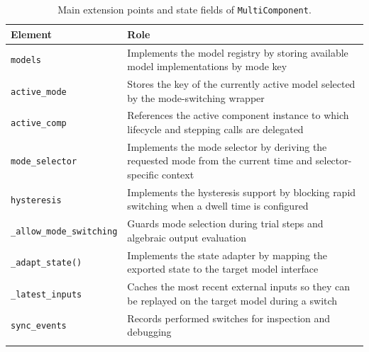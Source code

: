 \begin{table}[t]
  \centering
  \caption[Multi-component extension points.]{Main extension points and state fields of \texttt{MultiComponent}.}
  \label{tab:multi_component_contract}
  \begin{tabular}{lp{9.5cm}}
    \toprule
    \textbf{Element}                  & \textbf{Role}                                                                                                   \\
    \midrule
    \texttt{models}                   & Implements the model registry by storing available model implementations by mode key                            \\
    \addlinespace
    \texttt{active\_mode}             & Stores the key of the currently active model selected by the mode-switching wrapper                             \\
    \addlinespace
    \texttt{active\_comp}             & References the active component instance to which lifecycle and stepping calls are delegated                    \\
    \addlinespace
    \texttt{mode\_selector}           & Implements the mode selector by deriving the requested mode from the current time and selector-specific context \\
    \addlinespace
    \texttt{hysteresis}               & Implements the hysteresis support by blocking rapid switching when a dwell time is configured                   \\
    \addlinespace
    \texttt{\_allow\_mode\_switching} & Guards mode selection during trial steps and algebraic output evaluation                                        \\
    \addlinespace
    \texttt{\_adapt\_state()}         & Implements the state adapter by mapping the exported state to the target model interface                        \\
    \addlinespace
    \texttt{\_latest\_inputs}         & Caches the most recent external inputs so they can be replayed on the target model during a switch              \\
    \addlinespace
    \texttt{sync\_events}             & Records performed switches for inspection and debugging                                                         \\
    \addlinespace
    \bottomrule
  \end{tabular}
\end{table}

